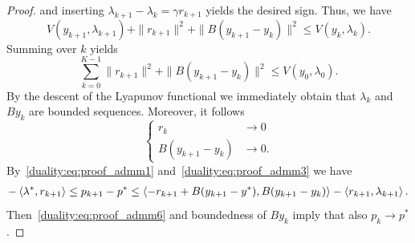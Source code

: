 \begin{proof}
    and inserting $\lambda_{k+1}-\lambda_k = \gamma r_{k+1}$ yields the desired sign. Thus, we have
    \begin{equation}
        V(y_{k+1},\lambda_{k+1}) + \|r_{k+1}\|^2 + \|B(y_{k+1}-y_k)\|^2 \leq V(y_{k},\lambda_{k}).
    \end{equation}
    Summing over $k$ yields
    \begin{equation}
        \sum_{k=0}^{K-1}\|r_{k+1}\|^2 + \|B(y_{k+1}-y_k)\|^2 \leq V(y_{0},\lambda_{0}).
    \end{equation}
    By the descent of the Lyapunov functional we immediately obtain that $\lambda_k$ and $By_k$ are bounded sequences.
    Moreover, it follows
    \begin{equation}\label{duality:eq:proof_admm6}
        \begin{cases}
            r_k&\rightarrow 0\\
            B(y_{k+1}-y_k)&\rightarrow 0.
        \end{cases}
    \end{equation}
    By~\eqref{duality:eq:proof_admm1} and~\eqref{duality:eq:proof_admm3} we have
    \begin{equation}
        \begin{aligned}
            -\left\langle\lambda^* , r_{k+1}\right\rangle\leq p_{k+1}-p^*\leq \left\langle-r_{k+1} + B(y_{k+1}-y^*) , B(y_{k+1}-y_k)\right\rangle - \left\langle r_{k+1} , \lambda_{k+1}\right\rangle.
        \end{aligned}
    \end{equation}
    Then~\eqref{duality:eq:proof_admm6} and boundedness of $By_k$ imply that also $p_{k}\rightarrow p^*$.
\end{proof}
